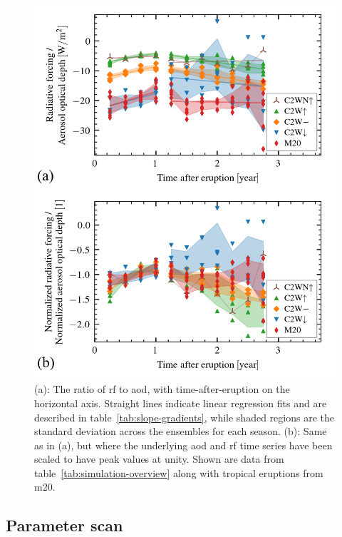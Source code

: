 \documentclass{ametsocV6.1}
\begin{document}
\begin{figure}
  \centering
  \includegraphics{figures/figure3.png}

  \caption{(a): The ratio of \gls{rf} to \gls{aod}, with time-after-eruption on the
    horizontal axis. Straight lines indicate linear regression fits and are described in
    table~\ref{tab:slope-gradients}, while shaded regions are the standard deviation across
    the ensembles for each season. (b): Same as in (a), but where the underlying \gls{aod}
    and \gls{rf} time series have been scaled to have peak values at unity. Shown are data
    from table~\ref{tab:simulation-overview} along with tropical eruptions from
    \gls{m20}.}\label{fig:aod_vs_toa_avg_loop_ratios}%
\end{figure}

\subsection{Parameter scan}
\end{document}
